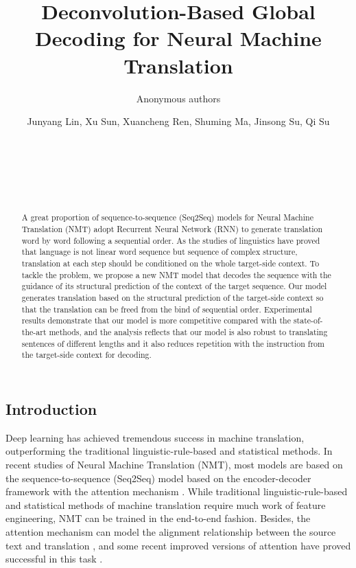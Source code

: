 \documentclass[11pt]{article}
\title{Deconvolution-Based Global Decoding for Neural Machine Translation}
\author{Anonymous authors}
\author{Junyang Lin\affmark[1,2], Xu Sun\affmark[2], Xuancheng Ren\affmark[2], Shuming Ma\affmark[2], Jinsong Su\affmark[3], Qi Su\affmark[1]\\
\affaddr{\affmark[1]School of Foreign Languages, Peking University}\\
\affaddr{\affmark[2]MOE Key Lab of Computational Linguistics, School of EECS, Peking University}\\
\affaddr{\affmark[3]School of Software, Xiamen University}\\
\email{\{linjunyang, xusun, renxc, shumingma, sukia\}@pku.edu.cn}\\
\email{jssu@xmu.edu.cn}\\
}
\date{}
\begin{document}
\maketitle
\begin{CJK}{UTF8}{gbsn}
\begin{abstract}
  A great proportion of sequence-to-sequence (Seq2Seq) models for Neural Machine Translation (NMT) adopt Recurrent Neural Network (RNN) to generate translation word by word following a sequential order. As the studies of linguistics have proved that language is not linear word sequence but sequence of complex structure, translation at each step should be conditioned on the whole target-side context. To tackle the problem, we propose a new NMT model that decodes the sequence with the guidance of its structural prediction of the context of the target sequence. Our model generates translation based on the structural prediction of the target-side context so that the translation can be freed from the bind of sequential order. Experimental results demonstrate that our model is more competitive compared with the state-of-the-art methods, and the analysis reflects that our model is also robust to translating sentences of different lengths and it also reduces repetition with the instruction from the target-side context for decoding.
\end{abstract}


\section{Introduction}
\label{intro}


Deep learning has achieved tremendous success in machine translation, outperforming the traditional linguistic-rule-based and statistical methods. In recent studies of Neural Machine Translation (NMT), most models are based on the sequence-to-sequence (Seq2Seq) model based on the encoder-decoder framework \citep{Kalchbrenner,seq2seq,ChoEA2014} with the attention mechanism \citep{attention,stanfordattention}. While traditional linguistic-rule-based and statistical methods of machine translation require much work of feature engineering, NMT can be trained in the end-to-end fashion. Besides, the attention mechanism can model the alignment relationship between the source text and translation \citep{attention,stanfordattention}, and some recent improved versions of attention have proved successful in this task \citep{coverage, micover,interactive,multichannel,googleattention}.



\end{CJK}
\end{document}

